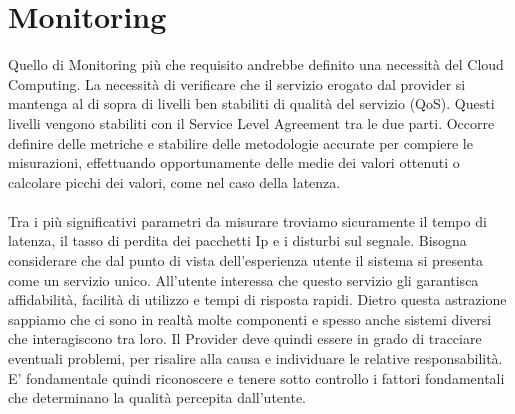 \section{Monitoring}
Quello di Monitoring più che requisito andrebbe definito una necessità del Cloud Computing. La necessità di verificare che il servizio erogato dal provider si mantenga al di sopra di livelli ben stabiliti di qualità del servizio (QoS). Questi livelli vengono stabiliti con il Service Level Agreement tra le due parti. Occorre definire delle metriche e stabilire delle metodologie accurate per compiere le misurazioni, effettuando opportunamente delle medie dei valori ottenuti o calcolare picchi dei valori, come nel caso della latenza.

\paragraph{}
Tra i più significativi parametri da misurare troviamo sicuramente il tempo di latenza, il tasso di perdita dei pacchetti Ip e i disturbi sul segnale. Bisogna considerare che dal punto di vista dell'esperienza utente il sistema si presenta come un servizio unico. All'utente interessa che questo servizio gli garantisca affidabilità, facilità di utilizzo e tempi di risposta rapidi. Dietro questa astrazione sappiamo che ci sono in realtà molte componenti e spesso anche sistemi diversi che interagiscono tra loro. Il Provider deve quindi essere in grado di tracciare eventuali problemi, per risalire alla causa e individuare le relative responsabilità. E' fondamentale quindi riconoscere e tenere sotto controllo i fattori  fondamentali che determinano la qualità percepita dall'utente.




